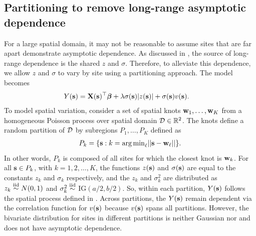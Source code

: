 \subsection{Partitioning to remove long-range asymptotic dependence}\label{sts:part}
For a large spatial domain, it may not be reasonable to assume sites that are far apart demonstrate asymptotic dependence.%
As discussed in , the source of long-range dependence is the shared $z$ and $\sigma$.
Therefore, to alleviate this dependence, we allow $z$ and $\sigma$ to vary by site using a partitioning approach.
The model becomes
\begin{align} \label{steq:partition}
  Y(\mathbf{s}) &= \mathbf{X}(\mathbf{s})^\top \mbox{\boldmath $\beta$} + \lambda \sigma(\mathbf{s}) |z(\mathbf{s})| + \sigma(\mathbf{s}) v(\mathbf{s}).
\end{align}
To model spatial variation, consider a set of spatial knots $\mathbf{w}_1, \ldots, \mathbf{w}_K$ from a homogeneous Poisson process over spatial domain ${\cal D} \in \mathbb{R}^2$.
The knots define a random partition of ${\cal D}$ by subregions $P_{1}, \ldots, P_{K}$ defined as
\begin{align} \label{steq:subregions}
  P_{k} = \{ \mathbf{s} : k = {\mathop{\rm arg\, min}}_\ell || \mathbf{s} - \mathbf{w}_{\ell} || \}.
\end{align}
In other words, $P_k$ is composed of all sites for which the closest knot is $\mathbf{w}_k$.
For all $\mathbf{s} \in P_k$, with $k = 1, 2, \ldots, K$, the functions $z(\mathbf{s})$ and $\sigma(\mathbf{s})$ are equal to the constants $z_k$ and $\sigma_k$ respectively, and the $z_k$ and $\sigma^2_k$ are distributed as $z_k \stackrel{\mathrm{iid}}{\sim} N(0, 1)$ and $\sigma^2_k \stackrel{\mathrm{iid}}{\sim}$ IG$(a / 2, b / 2)$.
So, within each partition, $Y(\mathbf{s})$ follows the spatial \skewt process defined in .
Across partitions, the $Y(\mathbf{s})$ remain dependent via the correlation function for $v(\mathbf{s})$ because $v(\mathbf{s})$ spans all partitions.
However, the bivariate distribution for sites in different partitions is neither Gaussian nor \skewt and does not have asymptotic dependence.

